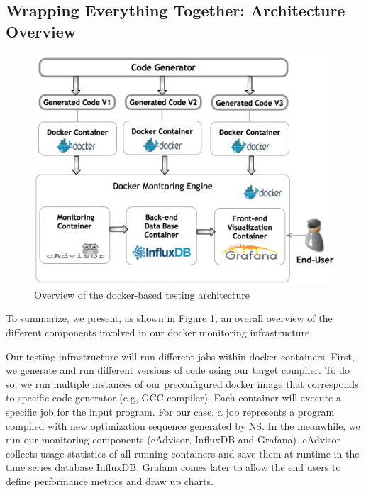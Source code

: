 \subsection{Wrapping Everything Together: Architecture Overview}
\begin{figure}[b!]
	\includegraphics[scale=0.48]{Ressources/infra.png}
	\caption{Overview of the docker-based testing architecture}
\end{figure}

To summarize, we present, as shown in Figure 1, an overall overview of the different components involved in our docker monitoring infrastructure.

Our testing infrastructure will run different jobs within docker containers. First, we generate and run different versions of code using our target compiler. To do so, we run multiple instances of our preconfigured docker image that corresponds to specific code generator (e.g, GCC compiler). Each container will execute a specific job for the input program. For our case, a job represents a program compiled with new optimization sequence generated by NS. In the meanwhile, we run our monitoring components (cAdvisor, InfluxDB and Grafana). cAdvisor collects usage statistics of all running containers and save them at runtime in the time series database InfluxDB. Grafana comes later to allow the end users to define performance metrics and draw up charts.
